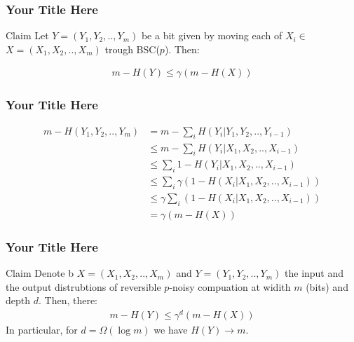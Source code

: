 \documentclass{beamer}
\begin{document}
\begin{frame}
  \frametitle{Your Title Here}
  
\begin{block}{Claim}
  Let $Y = \left(Y_{1}, Y_{2}, .., Y_{m}\right)$ be a bit given by moving each of $X_i \in$ $X = \left(X_{1}, X_{2}, .., X_{m}\right)$  trough BSC($p$). Then:

  \begin{equation*}
    \begin{split}
      m - H(Y) \le \gamma\left( m - H(X) \right)
    \end{split}
  \end{equation*}
\end{block}

\end{frame}
\begin{frame}
  \frametitle{Your Title Here}
  
  \begin{equation*}
    \begin{split}
      m - H\left( Y_{1}, Y_{2}, .., Y_{m} \right) &= m - \sum_{i} H\left( Y_{i} | Y_{1}, Y_{2}, .., Y_{i-1} \right) \\ 
      & \le m - \sum_{i} H\left( Y_{i} | X_{1}, X_{2}, .., X_{i-1} \right) \\ 
      & \le \sum_{i} 1 - H\left( Y_{i} | X_{1}, X_{2}, .., X_{i-1} \right) \\ 
      & \le \sum_{i} \gamma\left(1 - H\left( X_{i} | X_{1}, X_{2}, .., X_{i-1} \right)\right) \\ 
      & \le \gamma \sum_{i} \left(1 - H\left( X_{i} | X_{1}, X_{2}, .., X_{i-1} \right)\right)  \\
      &= \gamma\left( m - H\left( X \right) \right)
    \end{split}
  \end{equation*}
\end{frame}
\begin{frame}
  \frametitle{Your Title Here}
  
  
\begin{block}{Claim}
  Denote b $X = (X_{1}, X_{2}, .., X_{m})$ and $Y = (Y_1, Y_2 , .. ,Y_m)$ the input and the output distrubtions of reversible $p$-noisy compuation at widith $m$ (bits) and depth $d$. Then, there: 
  \begin{equation*}
    \begin{split}
      m - H(Y) \le \gamma^{d}\left( m - H(X) \right) 
    \end{split}
  \end{equation*}
  In particular, for $d = \Omega(\log m)$ we have $H(Y) \rightarrow m$. 


\end{block}


\end{frame}
\end{document}
